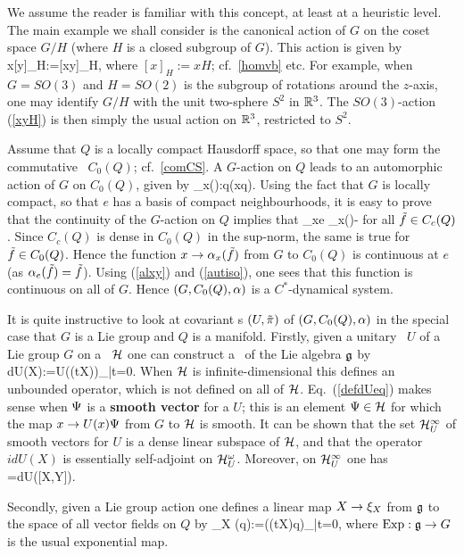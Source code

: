 We assume the reader is familiar with this concept, at least at a heuristic
level. The main example we shall consider is the canonical action of
$G$ on the coset space $G/H$ (where $H$ is a closed subgroup of $G$).
This action is given by
\be
x[y]_H:=[xy]_H, 
\ee
where $[x]_H:=xH$; cf.\ \ref{homvb} etc.
For example, when $G=SO(3)$ and $H=SO(2)$ is the subgroup of rotations
around the $z$-axis, one may identify $G/H$ with the unit two-sphere
$S^2$ in ${\Bbb R}^3$. The $SO(3)$-action (\ref{xyH}) is then simply the usual
action on ${\Bbb R}^3$, restricted to $S^2$.

Assume that $Q$ is a locally compact Hausdorff space, so that one may
form the commutative \ca\ $C_0(Q)$; cf.\ \ref{comCS}.  A $G$-action on
$Q$ leads to an automorphic action of $G$ on $C_0(Q)$, given by \be
\al_x():q\raw {}(x\inv q).  \ee Using the fact
that $G$ is locally compact, so that $e$ has a basis of compact
neighbourhoods, it is easy to prove that the continuity of the
$G$-action on $Q$ implies that \be \lim_{x\raw e}
\n\al_x()- \ee for all $\tilde{f}\in C_c(Q)$. Since
$C_c(Q)$ is dense in $C_0(Q)$ in the sup-norm, the same is true for
$\tilde{f}\in C_0(Q)$. Hence the function $x\rightarrow \alpha_x(\tilde{f})$ from
$G$ to $C_0(Q)$ is continuous at $e$ (as $\alpha_e(\tilde{f})=\tilde{f}$).  Using
(\ref{alxy}) and (\ref{autiso}), one sees that this function is
continuous on all of $G$. Hence $(G,C_0(Q),\alpha)$ is a $C^*$-dynamical
system.

It is quite instructive to look at covariant \rep s $(U,\tilde{\pi})$ of
 $(G,C_0(Q),\alpha)$ in the special case that $G$ is a Lie group and $Q$
 is a manifold. Firstly, given a unitary \rep\ $U$ of a Lie group $G$
 on a \Hs\ ${\cal H}$ one can construct a \rep\ of the Lie algebra ${\frak g}$ by
 \be dU(X)\Ps:=\ddt U(\Exp(tX))\Ps_{|t=0}.  \ee When ${\cal H}$
 is infinite-dimensional this defines an unbounded operator, which is
 not defined on all of ${\cal H}$. Eq.\ (\ref{defdUeq}) makes sense when
 $\Psi$ is a {\bf smooth vector} for a $U$; this is an element
 $\Psi\in{\cal H}$ for which the map $x\rightarrow U(x)\Psi$ from $G$ to ${\cal H}$ is
 smooth.  It can be shown that the set ${\cal H}_U^{\infty}$ of smooth
 vectors for $U$ is a dense linear subspace of ${\cal H}$, and that the
 operator $idU(X)$ is essentially self-adjoint on
 ${\cal H}_U^{\omega}$. Moreover, on ${\cal H}_U^{\infty}$ one has \be
 [dU(X),dU(Y)]=dU([X,Y]).  \ee

Secondly, given a Lie group action one defines a linear map $X\rightarrow \xi_X$ 
from ${\frak g}$ to the space of all vector fields on $Q$  by  
\be
\xi_X (q):=\ddt {}(\Exp(tX)q)_{|t=0}, 
\ee
where ${\rm Exp}:{\frak g}\rightarrow G$ is the usual exponential map.


